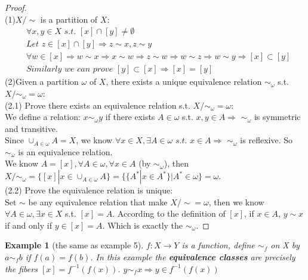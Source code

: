 \documentclass[11pt,a4paper]{article}
\newtheorem{example}{Example}
\begin{document}
\begin{proof}
    \quad\\
    (1)$X/\sim$ is a partition of $X$:\\
    \begin{equation}
        \begin{aligned}
            &\forall x,y\in X \textit{ s.t. }[x]\cap[y]\neq \emptyset\\
            &\textit{Let } z\in[x]\cap[y]\Rightarrow z\sim x, z\sim y\\
            &\forall w\in[x]\Rightarrow w\sim x\Rightarrow x\sim w\Rightarrow z\sim w\Rightarrow w\sim z\Rightarrow w\sim y\Rightarrow [x]\subset [y]\\
            &\textit{Similarly we can prove } [y]\subset [x]\Rightarrow [x]=[y]
        \end{aligned}
        \nonumber
    \end{equation}
    (2)Given a partition $\omega$ of $X$, there exists a unique equivalence relation $\sim_\omega$ s.t. $X/\sim_\omega=\omega$:\\
    (2.1) Prove there exists an equivalence relation s.t. $X/\sim_\omega=\omega$:\\
    We define a relation: $x\sim_\omega y$ if there exists $A\in \omega$ s.t. $x,y\in A\Rightarrow$ $\sim_\omega$ is symmetric and transitive.\\
    Since $\cup_{A\in\omega}A=X$, we know $\forall x\in X, \exists A\in \omega \textit{ s.t. } x\in A\Rightarrow$ $\sim_\omega$ is reflexive. So $\sim_\omega$ is an equivalence relation.\\
    We know $A=[x], \forall A\in\omega, \forall x\in A$ (by $\sim_\omega$),
    then $X/\sim_\omega= \{[x]|x\in \cup_{A\in\omega}A \}=\{\{A^*|x\in A^*\}|A^*\in\omega \}=\omega$.\\
    (2.2) Prove the equivalence relation is unique:\\
    Set $\sim$ be any equivalence relation that make $X/\sim=\omega$, then we know $\forall A\in \omega, \exists x\in X$ s.t. $[x]=A$. According to the definition of $[x]$, if $x\in A$, $y\sim x$ if and only if $y\in[x]=A$. Which is exactly the $\sim_\omega$.
\end{proof}
\begin{example}[the same as example 5]
    $f:X \rightarrow Y$ is a function, define $\sim_f$ on X by $a\sim_f b$ if $f(a)=f(b)$. In this example the \textbf{equivalence classes} are precisely the fibers $[x]=f^{-1}(f(x))$. $y\sim_f x\Rightarrow y\in f^{-1}(f(x))$
\end{example}
\end{document}
